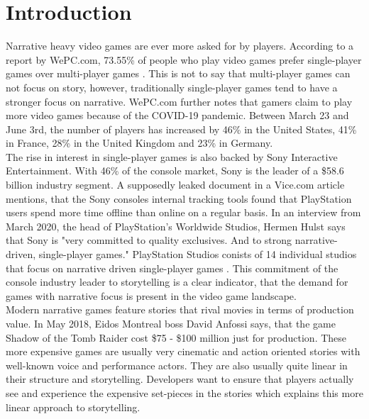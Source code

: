 \chapter{Introduction}
Narrative heavy video games are ever more asked for by players. According to a report by WePC.com, 73.55\% of people who play video games prefer single-player games over multi-player games \cite{WePC2021}. This is not to say that multi-player games can not focus on story, however, traditionally single-player games tend to have a stronger focus on narrative. WePC.com further notes that gamers claim to play more video games because of the COVID-19 pandemic. Between March 23 and June 3rd, the number of players has increased by 46\% in the United States, 41\% in France, 28\% in the United Kingdom and 23\% in Germany. \cite{WePC2021}\\
The rise in interest in single-player games is also backed by Sony Interactive Entertainment. With 46\% of the console market, Sony is the leader of a \$58.6 billion industry segment. \cite{Dealessandri2021} A supposedly leaked document in a Vice.com article mentions, that the Sony consoles internal tracking tools found that PlayStation users spend more time offline than online on a regular basis. \cite{Klepek2020} In an interview from March 2020, the head of PlayStation's Worldwide Studios, Hermen Hulst says that Sony is "very committed to quality exclusives. And to strong narrative-driven, single-player games." \cite{Shuman2021} PlayStation Studios conists of 14 individual studios that focus on narrative driven single-player games \cite{Sony2021}. This commitment of the console industry leader to storytelling is a clear indicator, that the demand for games with narrative focus is present in the video game landscape.\\
Modern narrative games feature stories that rival movies in terms of production value. In May 2018, Eidos Montreal boss David Anfossi says, that the game Shadow of the Tomb Raider cost \$75 - \$100 million just for production. These more expensive games are usually very cinematic and action oriented stories with well-known voice and performance actors. They are also usually quite linear in their structure and storytelling. Developers want to ensure that players actually see and experience the expensive set-pieces in the stories  which explains this more linear approach to storytelling.\\
